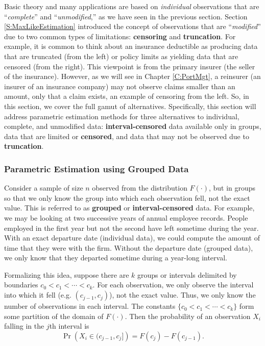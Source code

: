 \documentclass[]{book}
\theoremstyle{definition}
\theoremstyle{definition}
\theoremstyle{definition}
\theoremstyle{remark}
\begin{document}
Basic theory and many applications are based on \emph{individual}
observations that are ``\emph{complete}'' and ``\emph{unmodified},'' as
we have seen in the previous section. Section \ref{S:MaxLikeEstimation}
introduced the concept of observations that are ``\emph{modified}'' due
to two common types of limitations: \textbf{censoring} and
\textbf{truncation}. For example, it is common to think about an
insurance deductible as producing data that are truncated (from the
left) or policy limits as yielding data that are censored (from the
right). This viewpoint is from the primary insurer (the seller of the
insurance). However, as we will see in Chapter \ref{C:PortMgt}, a
reinsurer (an insurer of an insurance company) may not observe claims
smaller than an amount, only that a claim exists, an example of
censoring from the left. So, in this section, we cover the full gamut of
alternatives. Specifically, this section will address parametric
estimation methods for three alternatives to individual, complete, and
unmodified data: \textbf{interval-censored} data available only in
groups, data that are limited or \textbf{censored}, and data that may
not be observed due to \textbf{truncation}.

\subsubsection{Parametric Estimation using Grouped
Data}\label{S:MS:GroupedData}

Consider a sample of size \(n\) observed from the distribution
\(F(\cdot)\), but in groups so that we only know the group into which
each observation fell, not the exact value. This is referred to as
\textbf{grouped} or \textbf{interval-censored} data. For example, we may
be looking at two successive years of annual employee records. People
employed in the first year but not the second have left sometime during
the year. With an exact departure date (individual data), we could
compute the amount of time that they were with the firm. Without the
departure date (grouped data), we only know that they departed sometime
during a year-long interval.

Formalizing this idea, suppose there are \(k\) groups or intervals
delimited by boundaries \(c_0 < c_1< \cdots < c_k\). For each
observation, we only observe the interval into which it fell (e.g.
\((c_{j-1}, c_j)\)), not the exact value. Thus, we only know the number
of observations in each interval. The constants
\(\{c_0 < c_1 < \cdots < c_k\}\) form some partition of the domain of
\(F(\cdot)\). Then the probability of an observation \(X_i\) falling in
the \(j\)th interval is \[\Pr\left(X
_i \in (c_{j-1}, c_j]\right) = F(c_j) - F(c_{j-1}).\]
\end{document}
